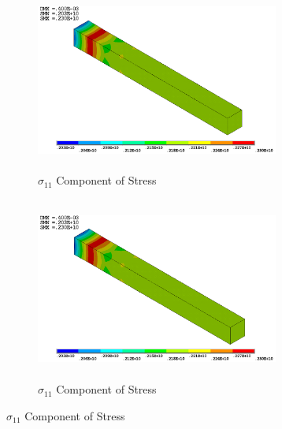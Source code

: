 \documentclass[12pt,openright,twoside]{report}
\begin{document}
\begin{figure}[htbp!]
     \captionsetup[subfigure]{justification=centering}
     \begin{subfigure}[b]{0.4\textwidth}
         \includegraphics[width=8cm,height=6cm]{15.Ansys_SX.png}
         \caption{$\sigma_{11}$ Component of Stress}
         \label{fig:X Component of Stress}
     \end{subfigure}
     \hspace{1.85cm}
     \begin{subfigure}[b]{0.4\textwidth}
         \includegraphics[width=8cm,height=6cm]{18.User_SX.png}
         \caption{$\sigma_{11}$ Component of Stress}
         \label{fig:X Component of Stress2}
     \end{subfigure}
\end{figure}
\FloatBarrier
\end{document}
